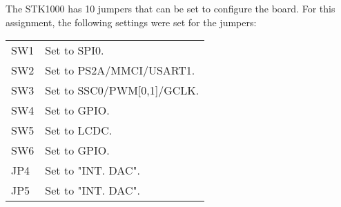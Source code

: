 The STK1000 has 10 jumpers that can be set to configure the board.
For this assignment, the following settings were set for the jumpers:

\begin{table}
\begin{tabular}{|l|l|}

SW1 &
Set to SPI0.
\\

SW2 &
Set to PS2A/MMCI/USART1.
\\

SW3 &
Set to SSC0/PWM[0,1]/GCLK.
\\

SW4 &
Set to GPIO.
\\

SW5 &
Set to LCDC.
\\

SW6 &
Set to GPIO.
\\

JP4 &
Set to "INT. DAC".
\\

JP5 &
Set to "INT. DAC".
\\

\end{tabular}
\end{table}

